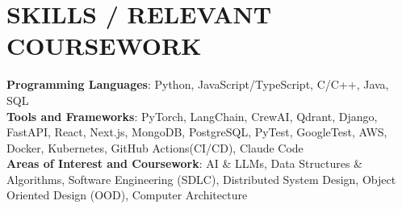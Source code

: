 \documentclass[letterpaper,11pt]{article}
\newcommand{\SectionListBegin}{\begin{itemize}[leftmargin=0.15in, label={}]}
\newcommand{\SectionListEnd}{\end{itemize}}
\begin{document}
\section{SKILLS / RELEVANT COURSEWORK}
  \SectionListBegin
    \small{\item{
    \vspace{1mm}
     \textbf{Programming Languages}{: Python, JavaScript/TypeScript, C/C++, Java, SQL} \\
     \vspace{1mm}
     \textbf{Tools and Frameworks}{: PyTorch, LangChain, CrewAI, Qdrant, Django, FastAPI, React, Next.js, MongoDB, PostgreSQL, PyTest, GoogleTest, AWS, Docker, Kubernetes, GitHub Actions(CI/CD), Claude Code}\\
     \vspace{1mm}
     \textbf{Areas of Interest and Coursework}{: AI \& LLMs, Data Structures \& Algorithms, Software Engineering (SDLC), Distributed System Design, Object Oriented Design (OOD), Computer Architecture} \\
     \vspace{1mm}
    }}
  \SectionListEnd

\end{document}
